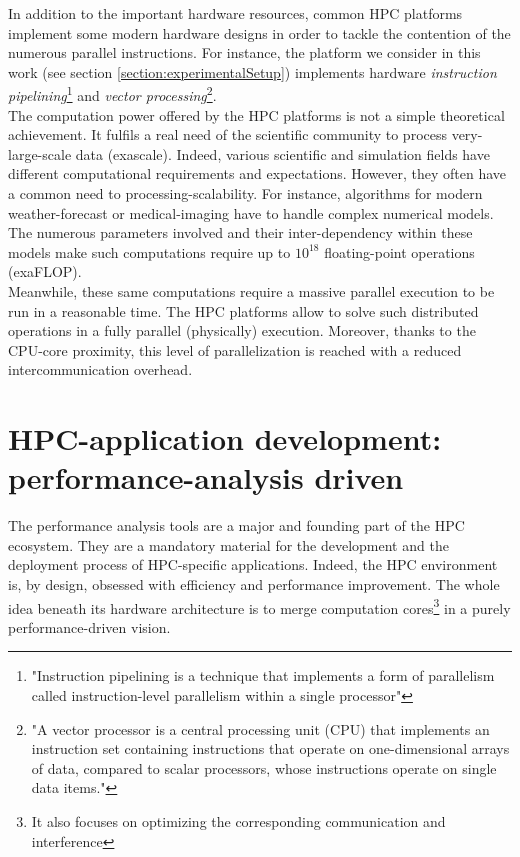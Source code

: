 	In addition to the important hardware resources, common HPC platforms implement some modern hardware designs in order to tackle the contention of the numerous parallel instructions.   For instance, the platform we consider in this work (see section \ref{section:experimentalSetup}) implements hardware \emph{instruction pipelining}\footnote{"Instruction pipelining is a technique that implements a form of parallelism called instruction-level parallelism within a single processor"\cite{wikipediaInstructionPipelining}} and \emph{vector processing}\footnote{"A vector processor is a central processing unit (CPU) that implements an instruction set containing instructions that operate on one-dimensional arrays of data, compared to scalar processors, whose instructions operate on single data items."\cite{wikipediaVectorProcessor}}.\\

	The computation power offered by the HPC platforms is not a simple theoretical achievement.   It fulfils a real need of the scientific community to process very-large-scale data (exascale).   Indeed, various scientific and simulation fields have different computational requirements and expectations.   However, they often have a common need to processing-scalability.   For instance, algorithms for modern weather-forecast or medical-imaging have to handle complex numerical models.   The numerous parameters involved and their inter-dependency within these models make such computations require up to $10^{18}$ floating-point operations (exaFLOP).\\
	Meanwhile, these same computations require a massive parallel execution to be run in a reasonable time.   The HPC platforms allow to solve such distributed operations in a fully parallel (physically) execution.   Moreover, thanks to the CPU-core proximity, this level of parallelization is reached with a reduced intercommunication overhead.\\


\section{HPC-application development: performance-analysis driven}\label{section:environment}
	The performance analysis tools are a major and founding part of the HPC ecosystem.   They are a mandatory material for the development and the deployment process of HPC-specific applications.   Indeed, the HPC environment is, by design, obsessed with efficiency and performance improvement.   The whole idea beneath its hardware architecture is to merge computation cores\footnote{It also focuses on optimizing the corresponding communication and interference} in a purely performance-driven vision.\\

